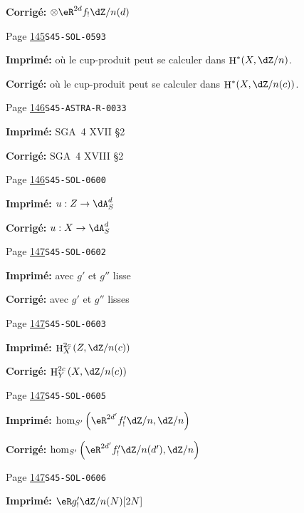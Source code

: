 \documentclass[oneside]{book}
\makeatletter
\DeclareMathOperator{\h}{H}
\theoremstyle{sga-source}
\theoremstyle{sga-source-dash}
\theoremstyle{sga-source-dotdash}
\theoremstyle{sga-source-number-note-dash}
\theoremstyle{sga-source-note-number-dotdash}
\theoremstyle{sga-source-example-dotdash}
\theoremstyle{sga-source-inline-number}
\theoremstyle{sga-source-bare-number}
\theoremstyle{sga-source}
\newcommand{\EditionRememberCite}[2][]{%
  \if@filesw\immediate\write\@auxout{\string\citation{#2}}\fi}
\DeclareRobustCommand{\PrintCite}[2]{%
  \begingroup\let\cite\EditionRememberCite
    \setbox\z@=\hbox{#2}%
  \endgroup#1}
\def\PrintCite#1#2{#1}%
\makeatother
\begin{document}
\begin{description}
\par\noindent\textbf{Corrigé:} \(\otimes \eR^{2 d} f_!\dZ/n(d)\)
\smallskip
\item[\hypertarget{apparatus:FR-0104}{104}] Page \hyperlink{printpage:fr:145}{145}\quad\texttt{S45-SOL-0593}
\par\noindent\textbf{Imprimé:} où le cup-produit peut se calculer dans $\h^*(X,\dZ/n)$.
\par\noindent\textbf{Corrigé:} où le cup-produit peut se calculer dans $\h^*(X,\dZ/n(c))$.
\smallskip
\item[\hypertarget{apparatus:FR-0105}{105}] Page \hyperlink{printpage:fr:146}{146}\quad\texttt{S45-ASTRA-R-0033}
\par\noindent\textbf{Imprimé:} \PrintCite{SGA~4 XVII \S2}{\cite[XVII \S2]{sga4}}
\par\noindent\textbf{Corrigé:} \PrintCite{SGA~4 XVIII \S2}{\cite[XVIII \S2]{sga4}}
\smallskip
\item[\hypertarget{apparatus:FR-0106}{106}] Page \hyperlink{printpage:fr:146}{146}\quad\texttt{S45-SOL-0600}
\par\noindent\textbf{Imprimé:} \(u:Z\to \dA_S^d\)
\par\noindent\textbf{Corrigé:} \(u:X\to \dA_S^d\)
\smallskip
\item[\hypertarget{apparatus:FR-0107}{107}] Page \hyperlink{printpage:fr:147}{147}\quad\texttt{S45-SOL-0602}
\par\noindent\textbf{Imprimé:} avec $g'$ et $g''$ lisse
\par\noindent\textbf{Corrigé:} avec $g'$ et $g''$ lisses
\smallskip
\item[\hypertarget{apparatus:FR-0108}{108}] Page \hyperlink{printpage:fr:147}{147}\quad\texttt{S45-SOL-0603}
\par\noindent\textbf{Imprimé:} \(\h_X^{2 c}\left(Z,\dZ/n(c)\right)\)
\par\noindent\textbf{Corrigé:} \(\h_Y^{2 c}\left(X,\dZ/n(c)\right)\)
\smallskip
\item[\hypertarget{apparatus:FR-0109}{109}] Page \hyperlink{printpage:fr:147}{147}\quad\texttt{S45-SOL-0605}
\par\noindent\textbf{Imprimé:} \(\hom_{S'}\left(\eR^{2 d'} f_!' \dZ/n,\dZ/n\right)\)
\par\noindent\textbf{Corrigé:} \(\hom_{S'}\left(\eR^{2 d'} f_!' \dZ/n(d'),\dZ/n\right)\)
\smallskip
\item[\hypertarget{apparatus:FR-0110}{110}] Page \hyperlink{printpage:fr:147}{147}\quad\texttt{S45-SOL-0606}
\par\noindent\textbf{Imprimé:} \(\eR g_!'\dZ/n(N)[2 N]\)

\end{description}
\end{document}
